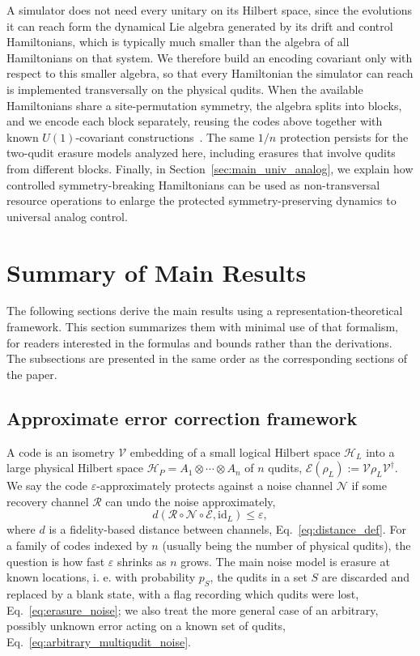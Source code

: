 \documentclass[10pt,twocolumn,superscriptaddress,aps,amsmath,amssymb,citeautoscript,floatfix,prx]{revtex4-2}
\newcounter{alg}
\theoremstyle{plain}
\theoremstyle{plain}
\theoremstyle{plain}
\theoremstyle{plain}
\theoremstyle{plain}
\theoremstyle{plain}
\theoremstyle{plain}
\theoremstyle{definition}
\theoremstyle{plain}
\begin{document}
A simulator does not need every unitary on its Hilbert space, since the evolutions it can reach form the dynamical Lie algebra generated by its drift and control Hamiltonians, which is typically much smaller than the algebra of all Hamiltonians on that system. We therefore build an encoding covariant only with respect to this smaller algebra, so that every Hamiltonian the simulator can reach is implemented transversally 
on the physical qudits. When the available Hamiltonians share a site-permutation symmetry, the algebra splits into blocks, and we encode each block separately, reusing the codes above together with known $U(1)$-covariant constructions~\cite{Lin2025}. The same $1/n$ protection persists for the two-qudit erasure models analyzed here, including erasures that involve qudits from different blocks.
Finally, in Section~\ref{sec:main_univ_analog}, we explain how controlled symmetry-breaking Hamiltonians can be used as non-transversal resource operations to enlarge the protected symmetry-preserving dynamics to universal analog control.

\section{Summary of Main Results}\label{sec:main_summary}
 
The following sections derive the main results using a representation-theoretical framework. 
This section summarizes them with minimal use of that formalism, for readers interested in the formulas and bounds rather than the derivations. The subsections are presented in the same order as the corresponding sections of the paper.
 
\subsection{Approximate error correction framework}\label{subsec:summary_framework}
 
A code is an isometry $\mathcal{V}$ embedding of a small logical Hilbert space $\mathcal H_L$ into a large physical Hilbert space $\mathcal H_P=A_1\otimes\cdots\otimes A_n$ of $n$ qudits, $\mathcal E(\rho_L):=\mathcal{V}\rho_L\mathcal{V}^\dagger$. 
We say the code $\varepsilon$-approximately protects against a noise channel $\mathcal N$ if some recovery channel $\mathcal R$ can undo the noise approximately,
$$
d(\mathcal R\circ\mathcal N\circ\mathcal E,\mathrm{id}_L)\le \varepsilon,
$$
where $d$ is a fidelity-based distance between channels, Eq.~\eqref{eq:distance_def}. For a family of codes indexed by $n$ (usually being the number of physical qudits), the question is how fast $\varepsilon$ shrinks as $n$ grows. 
The main noise model is erasure at known locations, i. e. with probability $p_S$, the qudits in a set $S$ are discarded and replaced by a blank state, with a flag recording which qudits were lost, Eq.~\eqref{eq:erasure_noise}; we also treat the more general case of an arbitrary, possibly unknown error acting on a known set of qudits, Eq.~\eqref{eq:arbitrary_multiqudit_noise}.
 
\end{document}

